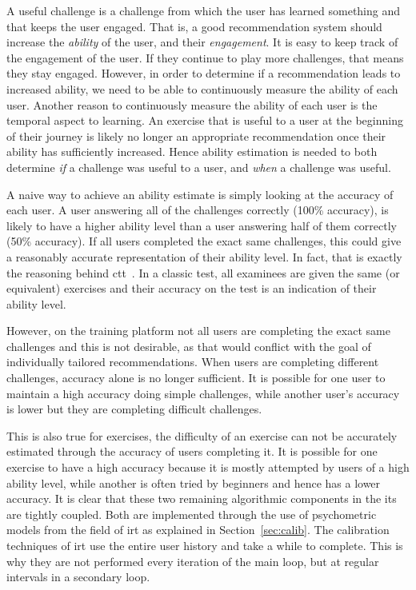 A useful challenge is a challenge from which the user has learned something and that keeps the user engaged.
That is, a good recommendation system should increase the \textit{ability} of the user, and their \textit{engagement}.
It is easy to keep track of the engagement of the user.
If they continue to play more challenges, that means they stay engaged.
However, in order to determine if a recommendation leads to increased ability, we need to be able to continuously measure the ability of each user.
Another reason to continuously measure the ability of each user is the temporal aspect to learning.
An exercise that is useful to a user at the beginning of their journey is likely no longer an appropriate recommendation once their ability has sufficiently increased.
Hence ability estimation is needed to both determine \textit{if} a challenge was useful to a user, and \textit{when} a challenge was useful.

A naive way to achieve an ability estimate is simply looking at the accuracy of each user.
A user answering all of the challenges correctly (100\% accuracy), is likely to have a higher ability level than a user answering half of them correctly (50\% accuracy).
If all users completed the exact same challenges, this could give a reasonably accurate representation of their ability level.
In fact, that is exactly the reasoning behind \gls{ctt}~\cite{ctt}.
In a classic test, all examinees are given the same (or equivalent) exercises and their accuracy on the test is an indication of their ability level.

However, on the training platform not all users are completing the exact same challenges and this is not desirable, as that would conflict with the goal of individually tailored recommendations.
When users are completing different challenges, accuracy alone is no longer sufficient.
It is possible for one user to maintain a high accuracy doing simple challenges, while another user's accuracy is lower but they are completing difficult challenges.

This is also true for exercises, the difficulty of an exercise can not be accurately estimated through the accuracy of users completing it.
It is possible for one exercise to have a high accuracy because it is mostly attempted by users of a high ability level, while another is often tried by beginners and hence has a lower accuracy.
It is clear that these two remaining algorithmic components in the \gls{its} are tightly coupled.
Both are implemented through the use of psychometric models from the field of \gls{irt} as explained in Section~\ref{sec:calib}.
The calibration techniques of \gls{irt} use the entire user history and take a while to complete.
This is why they are not performed every iteration of the main loop, but at regular intervals in a secondary loop.
